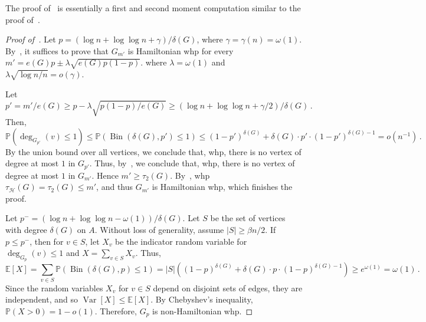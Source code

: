 \documentclass[reqno,final,a4paper]{amsart}
\numberwithin{equation}{section}
\theoremstyle{definition}
\theoremstyle{remark}
\renewcommand{\Pr}{\mathbb{P}}
\newcommand{\E}{\mathbb{E}}
\newcommand{\Var}{\operatorname{Var}}
\newcommand{\Bin}{\operatorname{Bin}}
\def\calH{\mathcal{H}}
\begin{document}
The proof of~ is essentially a first and second moment computation similar to the proof of~. 
\begin{proof}[Proof of~]
    Let $p = (\log n + \log\log n +\gamma)/\delta(G)$, where $\gamma = \gamma(n) = \omega(1)$.
    By~, it suffices to prove that $G_{m'}$ is Hamiltonian whp for every $m' = e(G)p\pm\lambda\sqrt{e(G)p(1-p)}$. where $\lambda = \omega(1)$ and $\lambda \sqrt{\log n/n} = o(\gamma)$. 

    Let 
    $$p' = m'/e(G) \geq p - \lambda\sqrt{p(1-p)/e(G)}\geq (\log n + \log\log n+\gamma/2)/\delta(G)\,.$$
    Then,
    $$\Pr(\deg_{G_{p'}}(v)\leq 1)\leq \Pr(\Bin(\delta(G), p')\leq 1)\leq (1-p')^{\delta(G)} + \delta(G)\cdot p' \cdot (1-p')^{\delta(G)-1} = o(n^{-1})\,.
    $$
    By the union bound over all vertices, we conclude that, whp, there is no vertex of degree at most $1$ in $G_{p'}$. 
    Thus, by~, we conclude that, whp, there is no vertex of degree at most $1$ in $G_{m'}$. Hence $m'\geq \tau_2(G)$. By~, whp $\tau_\calH(G)= \tau_2(G)\leq m'$, and thus $G_{m'}$ is Hamiltonian whp, which finishes the proof.

    Let $p^- = (\log n + \log\log n -\omega(1))/\delta(G)$.
    Let $S$ be the set of vertices with degree $\delta(G)$ on $A$. Without loss of generality, assume $|S|\geq \beta n/2$. 
    If $p\leq p^-$, then for $v\in S$, let $X_v$ be the indicator random variable for $\deg_{G_{p}}(v) \leq 1$ and $X = \sum_{v\in S}X_v$. Thus, 
    \[
        \E[X] = \sum_{v\in S}\Pr(\Bin(\delta(G), p) \leq 1) = |S|\left(
            (1-p)^{\delta(G)} + \delta(G) \cdot p \cdot (1-p)^{\delta(G)-1}
        \right)\geq e^{\omega(1)} = \omega(1)\,.
    \]
    Since the random variables $X_v$ for $v\in S$ depend on disjoint sets of edges, they are independent, and so $\Var[X] \leq \E[X]$. By Chebyshev's inequality, $\Pr(X > 0) = 1-o(1)$. Therefore, $G_{p}$ is non-Hamiltonian whp.
\end{proof}
\end{document}
